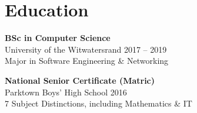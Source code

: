 \documentclass[10pt,a4paper]{article}
\begin{document}
\begin{minipage}[t]{0.57\textwidth}
    \section*{Education}
    \textbf{BSc in Computer Science} \\
    \textcolor{primary}{University of the Witwatersrand} \hfill 2017 -- 2019 \\
    {\small Major in Software Engineering \& Networking}
    
    \vspace{0.25cm}
    \textbf{National Senior Certificate (Matric)} \\
    \textcolor{primary}{Parktown Boys' High School} \hfill 2016 \\
    {\small 7 Subject Distinctions, including Mathematics \& IT}
\end{minipage}
\hfill
\end{document}
